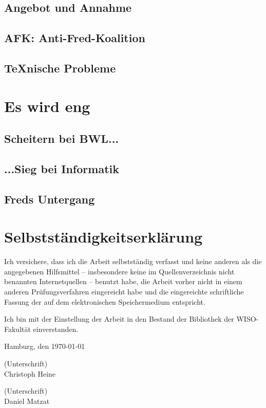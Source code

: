 \documentclass[12pt]{scrartcl}
\begin{document}
	\subsection{Angebot und Annahme}
	\subsection{AFK: Anti-Fred-Koalition}
	\subsection{TeXnische Probleme}
	
	\newpage
	\section{Es wird eng}
	\subsection{Scheitern bei BWL...}
	\subsection{...Sieg bei Informatik}
	\subsection{Freds Untergang}

	\newpage
	\begin{raggedright}%
		\begin{thebibliography}{XXXXXXXX}
		\end{thebibliography}
	\end{raggedright}
	
	\newpage
	
	\section{Selbstständigkeitserklärung}
	
	Ich versichere, dass ich die Arbeit selbstständig verfasst und keine anderen als die angegebenen Hilfsmittel -- insbesondere keine im Quellenverzeichnis nicht benannten Internetquellen -- benutzt habe, die Arbeit vorher nicht in einem anderen Prüfungsverfahren eingereicht habe und die eingereichte schriftliche Fassung der auf dem elektronischen Speichermedium entspricht.
	
	Ich bin mit der Einstellung der Arbeit in den Bestand der Bibliothek der WISO-Fakultät einverstanden.
	
	Hamburg, den \today
	
	\bigskip
	(Unterschrift)\\
	Christoph Heine
	
	\bigskip
	\bigskip
	(Unterschrift)\\
	Daniel Matzat
	
\end{document}
